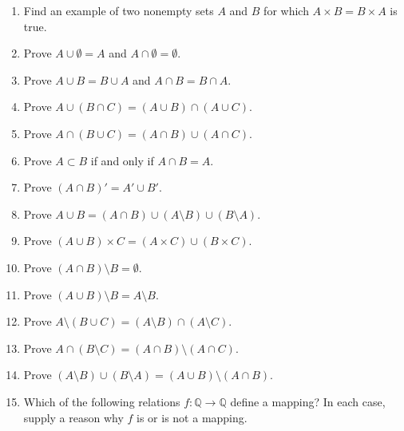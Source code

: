 {\begin{enumerate}
\begin{multicols}{2}
\begin{enumerate}
\end{enumerate}
\end{multicols}
  
\item
Find an example of two nonempty sets $A$ and $B$ for which $A \times B = B \times A$ is true. 

\item
Prove $A \cup \emptyset = A$ and $A \cap \emptyset = \emptyset$.
 
\item
Prove $A \cup B = B \cup A$ and $A \cap B = B \cap A$.
 
\item
Prove $A \cup (B \cap C) = (A \cup B) \cap (A \cup C)$.
 
\item
Prove $A \cap (B \cup C) = (A \cap B) \cup (A \cap C)$.
 
\item
Prove  $A \subset B$ if and only if $A \cap B = A$.
 
\item
Prove $(A \cap B)' = A' \cup B'$.

\item
Prove  $A \cup B = (A \cap B) \cup (A \setminus B) \cup (B \setminus A)$. 
 
\item
Prove  $(A \cup B) \times C = (A \times C ) \cup (B \times C)$.
 
\item
Prove  $(A \cap B) \setminus B = \emptyset$.
 
\item
Prove  $(A \cup B) \setminus B = A \setminus B$.
 
\item
Prove  $A \setminus (B \cup C) = (A \setminus B) \cap (A \setminus C)$. 

\item
Prove  $A \cap (B \setminus C) = (A \cap B) \setminus (A \cap C)$. 
 
 
\item
Prove  $(A \setminus B) \cup (B \setminus A) = (A \cup B) \setminus (A \cap B)$. 
 
\item
Which of the following relations $f: {\mathbb Q} \rightarrow {\mathbb Q}$
define a mapping? In each case, supply a reason why $f$ is or is not a
mapping. 
\begin{multicols}{2}
\begin{enumerate}


\end{enumerate}
\end{multicols}
\end{enumerate}}
